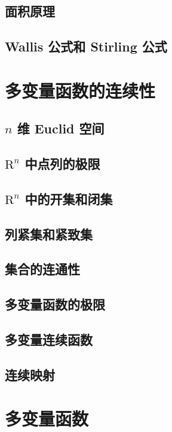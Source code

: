 \documentclass[a4paper, 11pt]{ctexbook}
\begin{document}
            \section{面积原理}
            \section{Wallis 公式和 Stirling 公式}
        \chapter{多变量函数的连续性}
            \section{\texorpdfstring{$n$}{n} 维 Euclid 空间}
                
            \section{\texorpdfstring{$\mathrm{R}^n$}{Rn} 中点列的极限}
                
            \section{\texorpdfstring{$\mathrm{R}^n$}{Rn} 中的开集和闭集}
                
            \section{列紧集和紧致集}
                
            \section{集合的连通性}
                
            \section{多变量函数的极限}
                
            \section{多变量连续函数}
                
            \section{连续映射}
        \chapter{多变量函数}
\end{document}
